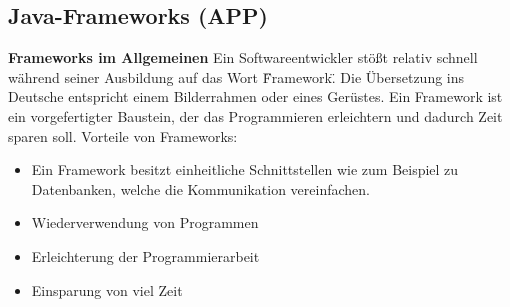 \clearpage
\subsection{Java-Frameworks (APP)}
\textbf{Frameworks im Allgemeinen\newline}
Ein Softwareentwickler stößt relativ schnell während seiner Ausbildung
auf das Wort \"Framework\". Die Übersetzung ins Deutsche entspricht einem Bilderrahmen oder eines Gerüstes.
Ein Framework ist ein vorgefertigter Baustein, der das Programmieren erleichtern und dadurch Zeit sparen soll.
Vorteile von Frameworks:
\begin{itemize}
	\item Ein Framework besitzt einheitliche Schnittstellen wie zum Beispiel zu Datenbanken, welche die Kommunikation vereinfachen. 
	\item Wiederverwendung von Programmen 
	\item Erleichterung der Programmierarbeit
	\item Einsparung von viel Zeit
\end{itemize}

